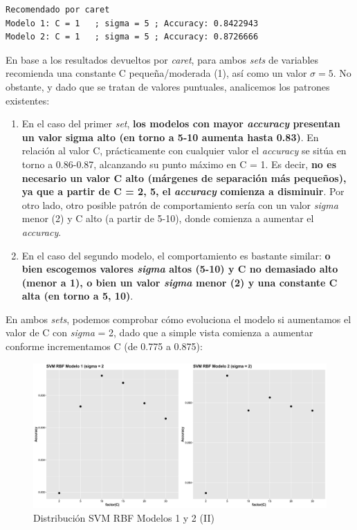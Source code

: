 \documentclass[
]{article}
\begin{document}
\begin{verbatim}
Recomendado por caret
Modelo 1: C = 1   ; sigma = 5 ; Accuracy: 0.8422943
Modelo 2: C = 1   ; sigma = 5 ; Accuracy: 0.8726666
\end{verbatim}

En base a los resultados devueltos por \emph{caret}, para ambos
\emph{sets} de variables recomienda una constante C pequeña/moderada
(1), así como un valor \(\sigma = 5\). No obstante, y dado que se tratan
de valores puntuales, analicemos los patrones existentes:

\begin{enumerate}
\def\labelenumi{\arabic{enumi}.}
\item
  En el caso del primer \emph{set}, \textbf{los modelos con mayor
  \emph{accuracy} presentan un valor sigma alto (en torno a 5-10 aumenta
  hasta 0.83)}. En relación al valor C, prácticamente con cualquier
  valor el \emph{accuracy} se sitúa en torno a 0.86-0.87, alcanzando su
  punto máximo en C = 1. Es decir, \textbf{no es necesario un valor C
  alto (márgenes de separación más pequeños), ya que a partir de C = 2,
  5, el \emph{accuracy} comienza a disminuir}. Por otro lado, otro
  posible patrón de comportamiento sería con un valor \emph{sigma} menor
  (2) y C alto (a partir de 5-10), donde comienza a aumentar el
  \emph{accuracy}.
\item
  En el caso del segundo modelo, el comportamiento es bastante similar:
  \textbf{o bien escogemos valores \emph{sigma} altos (5-10) y C no
  demasiado alto (menor a 1), o bien un valor \emph{sigma} menor (2) y
  una constante C alta (en torno a 5, 10)}.
\end{enumerate}

En ambos \emph{sets}, podemos comprobar cómo evoluciona el modelo si
aumentamos el valor de C con \emph{sigma} = 2, dado que a simple vista
comienza a aumentar conforme incrementamos C (de 0.775 a 0.875):

\begin{figure}[h!]

{\centering \includegraphics[width=0.99\linewidth,height=0.99\textheight,]{./charts/SVM/svm_rbf_modelos1_2_aumentando_C} 

}

\caption{Distribución SVM RBF Modelos 1 y 2 (II)}\label{fig:unnamed-chunk-123}
\end{figure}
\end{document}

